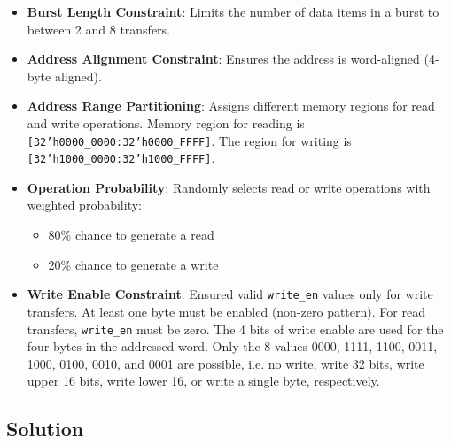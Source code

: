 \documentclass[../main.tex]{subfiles}
\begin{document}
\begin{itemize}
    \item \textbf{Burst Length Constraint}: Limits the number of data items in a burst to between 2 and 8 transfers.
    \item \textbf{Address Alignment Constraint}: Ensures the address is word-aligned (4-byte aligned).
    \item \textbf{Address Range Partitioning}: Assigns different memory regions for read and write operations. Memory region for reading is \texttt{[32'h0000\_0000:32'h0000\_FFFF]}. The region for writing is \texttt{[32'h1000\_0000:32'h1000\_FFFF]}.
    \item \textbf{Operation Probability}: Randomly selects read or write operations with weighted probability:
    \begin{itemize}
        \item 80\% chance to generate a read
        \item 20\% chance to generate a write
    \end{itemize}
    \item \textbf{Write Enable Constraint}: Ensured valid \texttt{write\_en} values only for write transfers. At least one byte must be enabled (non-zero pattern). For read transfers, \texttt{write\_en} must be zero. The 4 bits of write enable are used for the four bytes in the addressed word. Only the 8 values 0000, 1111, 1100, 0011, 1000, 0100, 0010, and 0001 are possible, i.e. no write, write 32 bits, write upper 16 bits, write lower 16, or write a single byte, respectively.
\end{itemize}

\subsection*{Solution}
\end{document}
